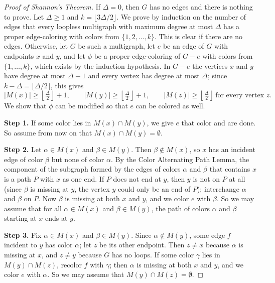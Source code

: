 \documentclass{article}
\theoremstyle{definition}
\begin{document}
\begin{proof}[Proof of Shannon's Theorem]
If $\Delta = 0$, then $G$ has no edges and there is nothing to prove. Let $\Delta \geq 1$ and $k = \lfloor 3\Delta/2 \rfloor$. We prove by induction on the number of edges that every loopless multigraph with maximum degree at most $\Delta$ has a proper edge-coloring with colors from $\{1, 2, \ldots, k\}$. This is clear if there are no edges. Otherwise, let $G$ be such a multigraph, let $e$ be an edge of $G$ with endpoints $x$ and $y$, and let $\phi$ be a proper edge-coloring of $G - e$ with colors from $\{1, \ldots, k\}$, which exists by the induction hypothesis. In $G - e$ the vertices $x$ and $y$ have degree at most $\Delta - 1$ and every vertex has degree at most $\Delta$; since $k - \Delta = \lfloor \Delta/2 \rfloor$, this gives
\begin{equation*}
|M(x)| \geq \left\lfloor \tfrac{\Delta}{2} \right\rfloor + 1, \qquad |M(y)| \geq \left\lfloor \tfrac{\Delta}{2} \right\rfloor + 1, \qquad |M(z)| \geq \left\lfloor \tfrac{\Delta}{2} \right\rfloor \ \text{for every vertex } z.
\end{equation*}
We show that $\phi$ can be modified so that $e$ can be colored as well.

\textbf{Step 1.} If some color lies in $M(x) \cap M(y)$, we give $e$ that color and are done. So assume from now on that $M(x) \cap M(y) = \emptyset$.

\textbf{Step 2.} Let $\alpha \in M(x)$ and $\beta \in M(y)$. Then $\beta \notin M(x)$, so $x$ has an incident edge of color $\beta$ but none of color $\alpha$. By the Color Alternating Path Lemma, the component of the subgraph formed by the edges of colors $\alpha$ and $\beta$ that contains $x$ is a path $P$ with $x$ as one end. If $P$ does not end at $y$, then $y$ is not on $P$ at all (since $\beta$ is missing at $y$, the vertex $y$ could only be an end of $P$); interchange $\alpha$ and $\beta$ on $P$. Now $\beta$ is missing at both $x$ and $y$, and we color $e$ with $\beta$. So we may assume that for all $\alpha \in M(x)$ and $\beta \in M(y)$, the path of colors $\alpha$ and $\beta$ starting at $x$ ends at $y$.

\textbf{Step 3.} Fix $\alpha \in M(x)$ and $\beta \in M(y)$. Since $\alpha \notin M(y)$, some edge $f$ incident to $y$ has color $\alpha$; let $z$ be its other endpoint. Then $z \neq x$ because $\alpha$ is missing at $x$, and $z \neq y$ because $G$ has no loops. If some color $\gamma$ lies in $M(y) \cap M(z)$, recolor $f$ with $\gamma$; then $\alpha$ is missing at both $x$ and $y$, and we color $e$ with $\alpha$. So we may assume that $M(y) \cap M(z) = \emptyset$.


\end{proof}
\end{document}
